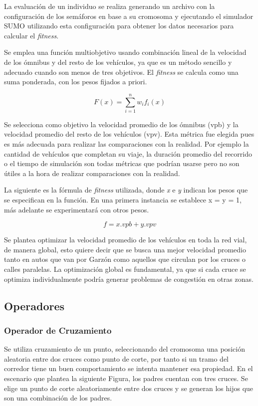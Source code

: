 La evaluación de un individuo se realiza generando un archivo con la configuración de los semáforos en base a su cromosoma y ejecutando el simulador SUMO utilizando esta configuración para obtener los datos necesarios para calcular el \emph{fitness}.

Se emplea una función multiobjetivo usando combinación lineal de la velocidad de los ómnibus y del resto de los vehículos, ya que es un método sencillo y adecuado cuando son menos de tres objetivos. El \emph{fitness} se calcula como una suma ponderada, con los pesos fijados a priori.

\begin{equation}
\label{eq:funcion_fitness_generica}
F(x) = \sum_{i=1}^{n}{w_i}{f_i}(x)
\end{equation}

Se selecciona como objetivo la velocidad promedio de los ómnibus (vpb) y la velocidad promedio del resto de los vehículos (vpv). Esta métrica fue elegida pues es más adecuada para realizar las comparaciones con la realidad. Por ejemplo la cantidad de vehículos que completan su viaje, la duración promedio del recorrido o el tiempo de simulación son todas métricas que podrían usarse pero no son útiles a la hora de realizar comparaciones con la realidad.

La siguiente es la fórmula de \emph{fitness} utilizada, donde \emph{x} e \emph{y} indican los pesos que se especifican en la función. En una primera instancia se establece x = y = 1, más adelante se experimentará con otros pesos.

\begin{equation}
\label{eq:funcion_fitness}
f = x.vpb + y.vpv
\end{equation}



Se plantea optimizar la velocidad promedio de los vehículos en toda la red vial, de manera global, esto quiere decir que se busca una mejor velocidad promedio tanto en autos que van por Garzón como aquellos que circulan por los cruces o calles paralelas. La optimización global es fundamental, ya que si cada cruce se optimiza individualmente podría generar problemas de congestión en otras zonas.

\subsection{Operadores}
\subsubsection{Operador de Cruzamiento}
Se utiliza cruzamiento de un punto, seleccionando del cromosoma una posición aleatoria entre dos cruces como punto de corte, por tanto si un tramo del corredor tiene un buen comportamiento se intenta mantener esa propiedad. En el escenario que plantea la siguiente Figura, los padres cuentan con tres cruces. Se elige un punto de corte aleatoriamente entre dos cruces y se generan los hijos que son una combinación de los padres.

